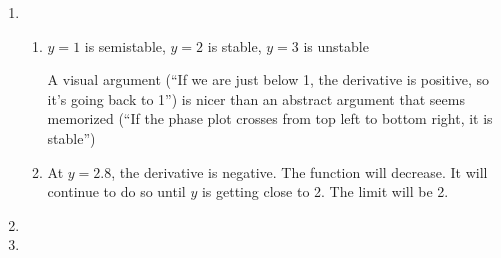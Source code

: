 \begin{enumerate}
\item 
\begin{enumerate}
    \item 
    $y=1$ is semistable,
    $y=2$ is stable,
    $y=3$ is unstable
    
    A visual argument (``If we are just below 1, the derivative is positive, so it's going back to 1'') is nicer than an abstract argument that seems memorized (``If the phase plot crosses from top left to bottom right, it is stable'')

    \item 
    At $y=2.8$, the derivative is negative. The function will decrease. It will continue to do so until $y$ is getting close to 2. The limit will be 2.
\end{enumerate}
\item 

\item  
\end{enumerate}